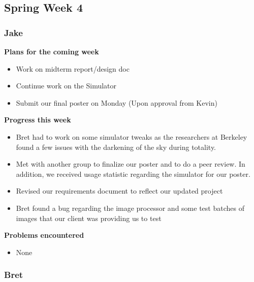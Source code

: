 \documentclass[10pt, onecolumn, draftclsnofoot, letterpaper, compsoc]{IEEEtran}
\begin{document}
\subsection{Spring Week 4}

    \subsubsection{Jake}

    \noindent \textbf{Plans for the coming week}

    \begin{itemize}

    \item Work on midterm report/design doc
    \item Continue work on the Simulator
    \item Submit our final poster on Monday (Upon approval from Kevin)

    \end{itemize}

    \noindent \textbf{Progress this week}

    \begin{itemize}

    \item Bret had to work on some simulator tweaks as the researchers at Berkeley found a few issues with the darkening of the sky during totality.
    \item Met with another group to finalize our poster and to do a peer review. In addition, we received usage statistic regarding the simulator for our poster.
    \item Revised our requirements document to reflect our updated project
    \item Bret found a bug regarding the image processor and some test batches of images that our client was providing us to test

    \end{itemize}

    \noindent \textbf{Problems encountered}

    \begin{itemize}

    \item None

    \end{itemize}

    \subsubsection{Bret}
\end{document}
